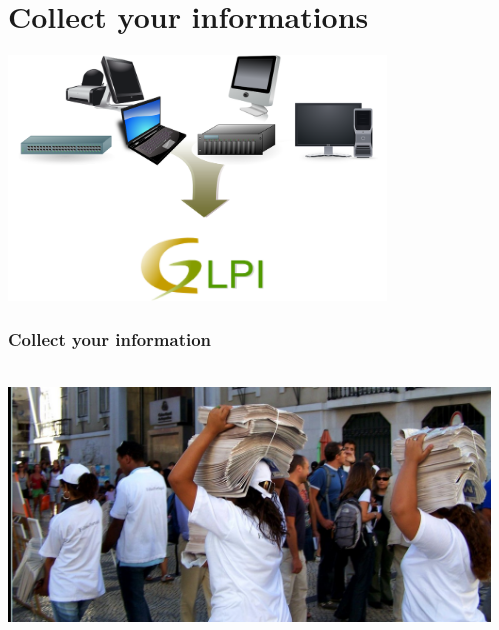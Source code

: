\documentclass{beamer}
\begin{document}
\section{Collect your informations}

\begin{frame}
\includegraphics[height=6.5cm]{pics/bigpicture.png}
\end{frame}


\begin{frame}

    \frametitle{Collect your information}

 \begin{columns}
 \begin{column}{0.34\textwidth}
    \includegraphics[height=6.5cm]{pics/information.jpg}
 \end{column}
 \begin{column}{0.90\textwidth}
 \end{column}
\end{columns}


\end{frame}
\end{document}
